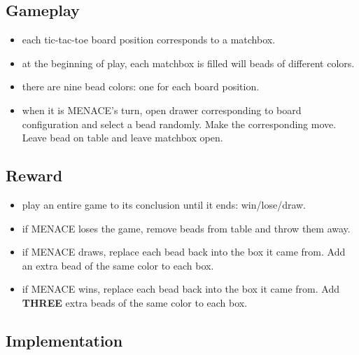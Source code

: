 \documentclass[journal, compsoc]{IEEEtran}
\begin{document}
\subsection{Gameplay}
\begin{itemize}
\item each tic-tac-toe board position corresponds to a matchbox.
\item at the beginning of play, each matchbox is filled will beads of different colors.
\item there are nine bead colors: one for each board position.
\item when it is MENACE’s turn, open drawer corresponding to board configuration
 and select a bead randomly. Make the corresponding move. Leave bead on
 table and leave matchbox open.

\end{itemize}

\subsection{Reward}
\begin{itemize}
\item play an entire game to its conclusion until it ends: win/lose/draw.
\item if MENACE loses the game, remove beads from table and throw them away.
\item if MENACE draws, replace each bead back into the box it came from. Add an
 extra bead of the same color to each box.
\item if MENACE wins, replace each bead back into the box it came from. Add \textbf{THREE} extra beads of the same color to each box.
\end{itemize}

\subsection{Implementation}
\end{document}
